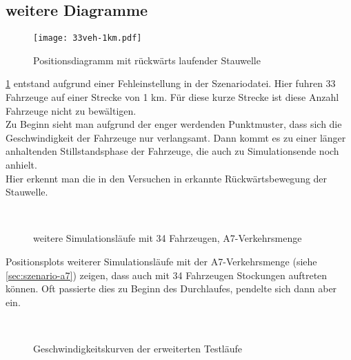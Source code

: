 \newpage

\subsection{weitere Diagramme}


\begin{figure}[hptb]
 \centering
 \texttt{[image: 33veh-1km.pdf]}
 \caption{Positionsdiagramm mit rückwärts laufender Stauwelle}
 \label{figure:33veh-1km}
\end{figure}

\cref{figure:33veh-1km} entstand aufgrund einer Fehleinstellung in der Szenariodatei.
Hier fuhren 33 Fahrzeuge auf einer Strecke von 1 km.
Für diese kurze Strecke ist diese Anzahl Fahrzeuge nicht zu bewältigen.
\\
Zu Beginn sieht man aufgrund der enger werdenden Punktmuster, dass sich die Geschwindigkeit der Fahrzeuge nur verlangsamt. Dann kommt es zu einer länger anhaltenden Stillstandsphase der Fahrzeuge, die auch zu Simulationsende noch anhielt.
\\
Hier erkennt man die in den Versuchen in \cite{na-sch} erkannte Rückwärtsbewegung der Stauwelle.


\newpage


\begin{figure}[hptb]
  \centering
    \\
  \caption{weitere Simulationsläufe mit 34 Fahrzeugen, A7-Verkehrsmenge}
  \label{figure:a7-34veh-more}
\end{figure}

Positionsplots weiterer Simulationsläufe mit der A7-Verkehrsmenge (siehe \cref{sec:szenario-a7}) zeigen, dass auch mit 34 Fahrzeugen Stockungen auftreten können.
Oft passierte dies zu Beginn des Durchlaufes, pendelte sich dann aber ein.


\newpage


\begin{figure}[hptb]
  \centering
   \qquad 
   \qquad 
    \\
  \caption{Geschwindigkeitskurven der erweiterten Testläufe}
  \label{figure:short-a7}
\end{figure}

